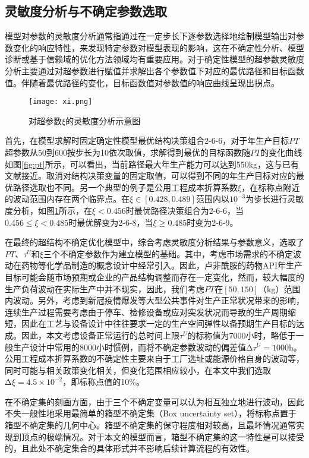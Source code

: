 \subsection{灵敏度分析与不确定参数选取}

模型对参数的灵敏度分析通常指通过在一定步长下逐参数选择地绘制模型输出对参数变化的响应特性，来发现特定参数对模型表现的影响，这在不确定性分析、模型诊断或基于信赖域的优化方法领域均有重要应用。对于确定性模型的超参数灵敏度分析主要通过对超参数进行赋值并求解出各个参数值下对应的最优路径和目标函数值。伴随着最优路径的变化，目标函数值对参数值的响应曲线呈现出拐点。

\begin{figure}
  \centering
  \texttt{[image: xi.png]}
  \caption{对超参数$\xi$的灵敏度分析示意图}
  \label{fig:xi}
\end{figure}

首先，在模型求解时固定确定性模型最优结构决策组合2-6-6，对于年生产目标$PT$超参数从50到600按步长为10依次取值，求解得到最优的目标函数随$PT$的变化曲线如图\ref{fig:pt}所示，可以看出，当前路径最大年生产能力可以达到550kg，这与已有文献\cite{gelonch2019}接近。取消对结构决策变量的固定取值，可以得到不同的年生产目标对应的最优路径选取也不同。另一个典型的例子是公用工程成本折算系数$\xi$，在标称点附近的波动范围内存在两个临界点。在$\xi\in\left[0.428,0.489\right]$范围内以$10^{-3}$为步长进行灵敏度分析，如图\ref{fig:xi}所示，在$\xi<0.456$时最优路径决策组合为2-6-6，当$0.456\le\xi<0.485$时最优解变为2-6-8，当$\xi\ge0.485$时变为2-6-9。

在最终的超结构不确定优化模型中，综合考虑灵敏度分析结果与参数意义，选取了$PT$、$\tau^U$和$\xi$三个不确定参数作为建立模型的基础。其中，考虑市场需求的不确定波动在药物等化学品制造的概念设计中经常引入\cite{pisti1995}。因此，卢非酰胺的药物API年生产目标可能会随市场预期或企业的产品结构调整而存在一定变化，然而，较大幅度的生产负荷波动在实际生产中并不现实，因此，我们考虑$PT$在$[50,150]$（kg）范围内波动。另外，考虑到新冠疫情爆发等大型公共事件对生产正常状况带来的影响，连续生产过程需要考虑由于停车、检修设备或应对突发状况而导致的生产周期缩短，因此在工艺与设备设计中往往要求一定的生产空间弹性以备预期生产目标的达成。因此，本文考虑设备正常运行的总时间上限$\tau^U$的标称值为7000小时，略低于一般生产设计中常用的8000小时惯例，而将不确定参数波动的偏差值$\increment \tau^U=1000$h。公用工程成本折算系数的不确定性主要来自于工厂选址或能源价格自身的波动等，同时可能与相关政策变化相关，但变化范围相应较小，在本文中我们选取$\increment\xi=4.5\times10^{-2}$，即标称点值的10\%。

在不确定集的刻画方面，由于三个不确定变量可以认为相互独立地进行波动，因此不失一般性地采用最简单的箱型不确定集（Box uncertainty set），将标称点置于箱型不确定集的几何中心。箱型不确定集的保守程度相对较高，且最坏情况通常实现到顶点的极端情况。对于本文的模型而言，箱型不确定集的这一特性是可以接受的，且此处不确定集合的具体形式并不影响后续计算流程的有效性。


